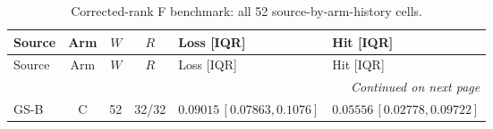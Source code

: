 \begingroup
\fontsize{9}{10.2}\selectfont
\setlength{\tabcolsep}{2.2pt}
\renewcommand{\arraystretch}{1.05}
\setlength{\LTpre}{2pt}
\setlength{\LTpost}{3pt}
\begin{longtable}{lcrcp{44mm}p{44mm}}
\caption{Corrected-rank F benchmark: all 52 source-by-arm-history cells.}\label{tab:v9-stability-f}\\
\toprule
Source & Arm & $W$ & $R$ & Loss [IQR] & Hit [IQR]\\
\midrule
\endfirsthead
\toprule
Source & Arm & $W$ & $R$ & Loss [IQR] & Hit [IQR]\\
\midrule
\endhead
\midrule
\multicolumn{6}{r}{\emph{Continued on next page}}\\
\endfoot
\bottomrule
\endlastfoot
GS-B & C & 52 & 32/32 & \(0.09015\,[0.07863,0.1076]\) & \(0.05556\,[0.02778,0.09722]\)\\

\end{longtable}
